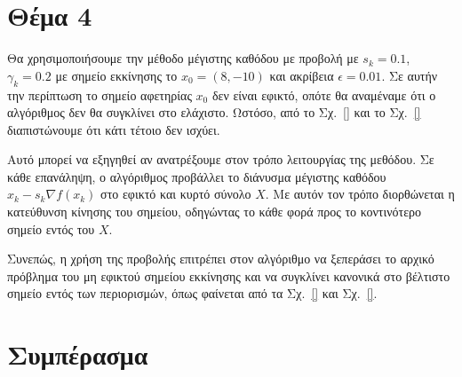 \documentclass[a4paper,12pt]{article}
\begin{document}
\section*{Θέμα 4}
Θα χρησιμοποιήσουμε την μέθοδο μέγιστης καθόδου με προβολή με $s_k = 0.1$, $\gamma_k = 0.2$ με σημείο εκκίνησης το 
$x_0 = (8, -10)$ και ακρίβεια $\epsilon = 0.01$. Σε αυτήν την περίπτωση το σημείο αφετηρίας $x_0$ δεν είναι εφικτό,
οπότε θα αναμέναμε ότι ο αλγόριθμος δεν θα συγκλίνει στο ελάχιστο. Ωστόσο, από το Σχ.~\ref{} και το Σχ.~\ref{}
διαπιστώνουμε ότι κάτι τέτοιο δεν ισχύει.

Αυτό μπορεί να εξηγηθεί αν ανατρέξουμε στον τρόπο λειτουργίας της μεθόδου. Σε κάθε επανάληψη, ο αλγόριθμος προβάλλει
το διάνυσμα μέγιστης καθόδου $x_k - s_k \nabla f(x_k)$ στο εφικτό και κυρτό σύνολο $X$. Με αυτόν τον τρόπο διορθώνεται 
η κατεύθυνση κίνησης του σημείου, οδηγώντας το κάθε φορά προς το κοντινότερο σημείο εντός του $X$.

Συνεπώς, η χρήση της προβολής επιτρέπει στον αλγόριθμο να ξεπεράσει το αρχικό πρόβλημα του μη εφικτού σημείου εκκίνησης 
και να συγκλίνει κανονικά στο βέλτιστο σημείο εντός των περιορισμών, όπως φαίνεται από τα Σχ.~\ref{} και Σχ.~\ref{}.

\section*{Συμπέρασμα}
\end{document}
